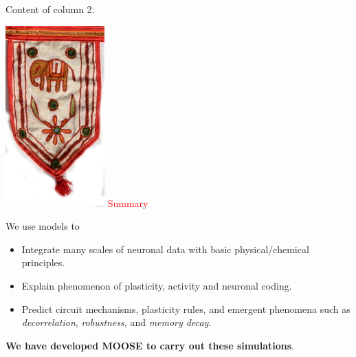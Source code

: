 \documentclass[a0paper,12pt]{article}
\newenvironment{Figure}
  {\par\medskip\noindent\minipage{\linewidth}}
  {\endminipage\par\medskip}
\newcommand{\HEADING}[1]
{
    \includegraphics[scale=0.25]{./images/heading.png} \vspace{-1cm}
    {\fontsize{2cm}{2em}\selectfont \textcolor{red}{#1}}
    \vspace{2cm}
}
\begin{document}
\begin{multicols}{3}
\begin{Figure}
    \HUGE
    Content of column 2.
\end{Figure}

\begin{Figure}
    
    \HEADING{Summary}

    \HUGE We use models to
    \begin{itemize}
            
        \item Integrate many scales of neuronal data with basic
            physical/chemical principles.
        \item Explain phenomenon of plasticity, activity and neuronal coding.
        \item Predict circuit mechanisms, plasticity rules, and emergent
            phenomena such as \emph{decorrelation}, \emph{robustness}, and
            \emph{memory decay}.

    \end{itemize}

    \textbf{We have developed MOOSE to carry out these simulations}.

\end{Figure}

\end{multicols}
\end{document}
